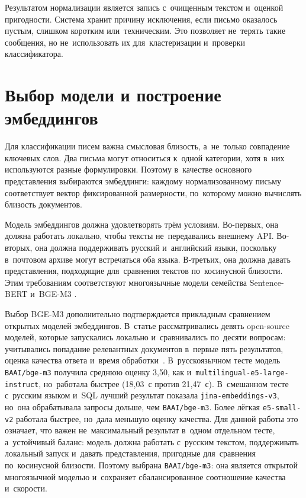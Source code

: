 Результатом нормализации является запись с~очищенным текстом и~оценкой
пригодности. Система хранит причину исключения, если письмо оказалось пустым,
слишком коротким или~техническим. Это позволяет не~терять такие сообщения, но
не~использовать их для~кластеризации и~проверки классификатора.

\section{Выбор модели и построение эмбеддингов}\label{sec:ch2/embeddings}

Для классификации писем важна смысловая близость, а~не~только совпадение
ключевых слов. Два письма могут относиться к~одной категории, хотя в~них
используются разные формулировки. Поэтому в~качестве основного представления
выбираются эмбеддинги: каждому нормализованному письму соответствует вектор
фиксированной размерности, по~которому можно вычислять близость документов.

Модель эмбеддингов должна удовлетворять трём условиям. Во-первых, она должна
работать локально, чтобы тексты не~передавались внешнему API. Во-вторых, она
должна поддерживать русский и~английский языки, поскольку в~почтовом архиве
могут встречаться оба языка. В-третьих, она должна давать представления,
подходящие для~сравнения текстов по~косинусной близости. Этим требованиям
соответствуют многоязычные модели семейства Sentence-BERT и~BGE-M3
\autocite{Reimers2019SBERT,Reimers2020MultilingualSBERT,Chen2024BGEM3}.

Выбор BGE-M3 дополнительно подтверждается прикладным сравнением открытых
моделей эмбеддингов. В~статье рассматривались девять open-source
моделей, которые запускались локально и~сравнивались по~десяти вопросам:
учитывались попадание релевантных документов в~первые пять результатов,
оценка качества ответа и~время обработки~\autocite{Bugra2025HabrEmbeddings}.
В~русскоязычном тесте модель \texttt{BAAI/bge-m3} получила среднюю оценку
3,50, как и~\texttt{multilingual-e5-large-instruct}, но~работала быстрее
(18,03~с против 21,47~с). В~смешанном тесте с~русским языком и~SQL лучший
результат показала \texttt{jina-embeddings-v3}, но~она обрабатывала запросы
дольше, чем \texttt{BAAI/bge-m3}. Более лёгкая \texttt{e5-small-v2} работала
быстрее, но~дала меньшую оценку качества. Для данной работы это означает, что
важен не~максимальный результат в~одном отдельном тесте, а~устойчивый баланс:
модель должна работать с~русским текстом, поддерживать локальный запуск
и~давать представления, пригодные для~сравнения по~косинусной близости. Поэтому
выбрана \texttt{BAAI/bge-m3}: она является открытой многоязычной моделью
и~сохраняет сбалансированное соотношение качества и~скорости.

